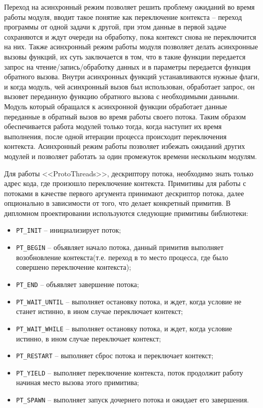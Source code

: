 Переход на асинхронный режим позволяет решить проблему ожиданий во время работы модуля, вводит такое понятие как переключение контекста -- переход программы
от одной задачи к другой, при этом данные в первой задаче сохраняются и ждут очереди на обработку, пока контекст снова не переключится на них. Также асинхронный
режим работы модуля позволяет делать асинхронные вызовы функций, их суть заключается в том, что в такие функции передается запрос на чтение/запись/обработку данных
и в параметры передается функция обратного вызова. Внутри асинхронных функций устанавливаются нужные флаги, и когда модуль, чей асинхронный вызов был использован,
обработает запрос, он вызовет переданную функцию обратного вызова с необходимыми данными. Модуль который обращался к асинхронной функции обработает данные переданные в обратный вызов
во время работы своего потока. Таким образом обеспечивается работа модулей только тогда, когда наступит их время выполнения, после одной итерации процесса происходит переключения контекста.
Асинхронный режим работы позволяет избежать ожиданий других модулей и позволяет работать за один промежуток времени нескольким модулям.

Для работы <<ProtoThreads>>, дескриптору потока, необходимо знать только адрес кода, где произошло переключение контекста.
Примитивы для работы с потоками в качестве первого аргумента принимают дескриптор потока,
далее опционально в зависимости от того, что делает конкретный примитив.
В дипломном проектировании используются следующие примитивы библиотеки:

\begin{itemize}
    \item \lstinline{PT_INIT} -- инициализирует поток;
    \item \lstinline{PT_BEGIN} -- объявляет начало потока, данный примитив выполняет возобновление контекста(т.е. переход в то место процесса, где было совершено переключение контекста);
    \item \lstinline{PT_END} -- объявляет завершение потока;
    \item \lstinline{PT_WAIT_UNTIL} -- выполняет остановку потока, и ждет, когда условие не станет истинно, в ином случае переключает контекст;
    \item \lstinline{PT_WAIT_WHILE} -- выполняет остановку потока, и ждет, когда условие истинно, в ином случае переключает контекст;
    \item \lstinline{PT_RESTART} -- выполняет сброс потока и переключает контекст;
    \item \lstinline{PT_YIELD} -- выполняет переключение контекста, поток продолжит работу начиная место вызова этого примитива;
    \item \lstinline{PT_SPAWN} -- выполняет запуск дочернего потока и ожидает его завершения.
\end{itemize}

